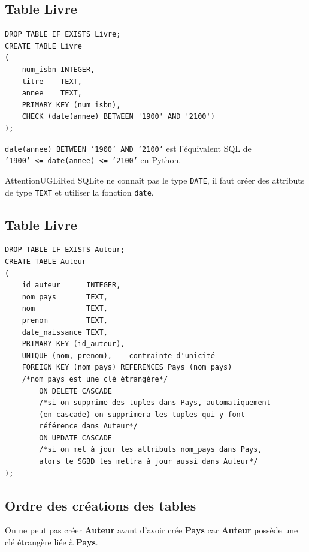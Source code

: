 \documentclass[10pt,cours,a4paper,firamath]{nsi}
\begin{document}
\subsection{Table \textbf{Livre}}


\begin{sql}
    \begin{verbatim}
DROP TABLE IF EXISTS Livre;
CREATE TABLE Livre
(
    num_isbn INTEGER,
    titre    TEXT,
    annee    TEXT,
    PRIMARY KEY (num_isbn),
    CHECK (date(annee) BETWEEN '1900' AND '2100')
);
\end{verbatim}
\end{sql}

\texttt{date(annee) BETWEEN '1900' AND '2100'} est l'équivalent SQL de\\\texttt{'1900' <= date(annee) <= '2100'} en Python.

\begin{encadrecolore}{Attention}{UGLiRed}
    SQLite ne connaît pas le type \texttt{DATE}, il faut créer des attributs de type \texttt{TEXT} et utiliser la fonction \texttt{date}. 
\end{encadrecolore}

\subsection{Table \textbf{Livre}}
\begin{sql}
    \begin{verbatim}
DROP TABLE IF EXISTS Auteur;
CREATE TABLE Auteur
(
    id_auteur      INTEGER,
    nom_pays       TEXT,
    nom            TEXT,
    prenom         TEXT,
    date_naissance TEXT,
    PRIMARY KEY (id_auteur),
    UNIQUE (nom, prenom), -- contrainte d'unicité
    FOREIGN KEY (nom_pays) REFERENCES Pays (nom_pays)
    /*nom_pays est une clé étrangère*/
        ON DELETE CASCADE
        /*si on supprime des tuples dans Pays, automatiquement
        (en cascade) on supprimera les tuples qui y font
        référence dans Auteur*/
        ON UPDATE CASCADE
        /*si on met à jour les attributs nom_pays dans Pays,
        alors le SGBD les mettra à jour aussi dans Auteur*/
);\end{verbatim}
\end{sql}

\subsection{Ordre des créations des tables}
On ne peut pas créer \textbf{Auteur} avant d'avoir crée \textbf{Pays} car \textbf{Auteur} possède une clé étrangère liée à \textbf{Pays}.
\end{document}
